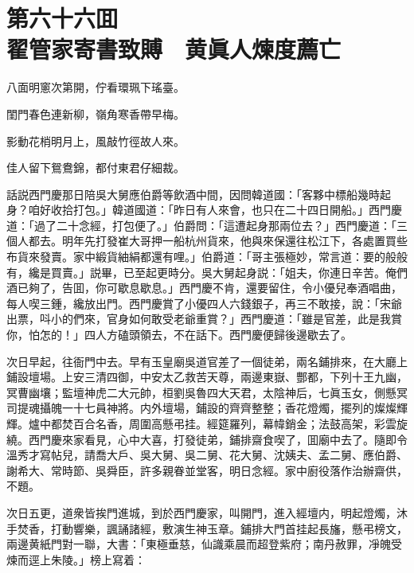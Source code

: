 
\chapter*{第六十六囬　\\翟管家寄書致賻　黄眞人煉度薦亡}


\begin{myquote}
八面明窻次第開，佇看環珮下瑤臺。

閨門春色連新柳，嶺角寒香帶早梅。

影動花梢明月上，風敲竹徑故人來。

佳人留下鴛鴦錦，都付東君仔細裁。
\end{myquote}

話説西門慶那日陪吳大舅應伯爵等飲酒中間，因問韓道國：「客夥中標船幾時起身？咱好收拾打包。」韓道國道：「昨日有人來會，也只在二十四日開船。」西門慶道：「過了二十念經，打包便了。」伯爵問：「這遭起身那兩位去？」西門慶道：「三個人都去。明年先打發崔大哥押一船杭州貨來，他與來保還往松江下，各處置買些布貨來發賣。家中緞貨紬絹都還有哩。」伯爵道：「哥主張極妙，常言道：要的般般有，纔是買賣。」説畢，已至起更時分。吳大舅起身説：「姐夫，你連日辛苦。俺們酒已夠了，告囬，你可歇息歇息。」西門慶不肯，還要留住，令小優兒奉酒唱曲，每人喫三鍾，纔放出門。西門慶賞了小優四人六錢銀子，再三不敢接，說：「宋爺出票，呌小的們來，官身如何敢受老爺重賞？」西門慶道：「雖是官差，此是我賞你，怕怎的！」四人方磕頭領去，不在話下。西門慶便歸後邊歇去了。

次日早起，往衙門中去。早有玉皇廟吳道官差了一個徒弟，兩名鋪排來，在大廳上鋪設壇場。上安三清四御，中安太乙救苦天尊，兩邊東嶽、酆都，下列十王九幽，冥曹幽壤；監壇神虎二大元帥，桓劉吳魯四大天君，太陰神后，七眞玉女，側懸冥司提魂攝魄一十七員神將。内外壇場，鋪設的齊齊整整；香花燈燭，擺列的燦燦輝輝。爐中都焚百合名香，周圍高懸弔挂。經筵羅列，幕幃銷金；法鼓高架，彩雲旋繞。西門慶來家看見，心中大喜，打發徒弟，鋪排齋食喫了，囬廟中去了。隨即令溫秀才寫帖兒，請喬大戶、吳大舅、吳二舅、花大舅、沈姨夫、孟二舅、應伯爵、謝希大、常時節、吳舜臣，許多親眷並堂客，明日念經。家中廚役落作治辦齋供，不題。

次日五更，道衆皆挨門進城，到於西門慶家，叫開門，進入經壇内，明起燈燭，沐手焚香，打動響樂，諷誦諸經，敷演生神玉章。鋪排大門首挂起長旛，懸弔榜文，兩邊黄紙門對一聯，大書：「東極垂慈，仙識乘晨而超登紫府；南丹赦罪，凈魄受煉而逕上朱陵。」榜上寫着：

